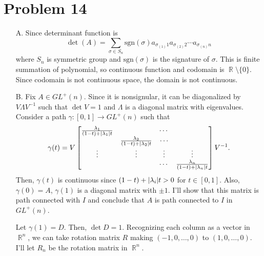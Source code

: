\documentclass{article}
\DeclareMathOperator{\rr}{\mathbb{R}}
\DeclarePairedDelimiter\abs{\lvert}{\rvert}%
\begin{document}
\section*{Problem 14}
\begin{enumerate}
\item[A.] Since determinant function is
\begin{equation*}
\det(A)=\sum\limits_{\sigma\in S_n} \text{sgn}(\sigma)a_{\sigma_(1)1}a_{\sigma_(2)2}\cdots a_{\sigma_(n)n}
\end{equation*}
where $S_n$ is symmetric group and $\text{sgn}(\sigma)$ is the signature of $\sigma$. This is finite summation of polynomial, so continuous function and codomain is $\rr\setminus\{0\}$. Since codomain is not continuous space, the domain is not continuous.
\item[B.] Fix $A\in GL^+(n)$. Since it is nonsignular, it can be diagonalized by $V\Lambda V^{-1}$ such that $\det{V}=1$ and $\Lambda$ is a diagonal matrix with eigenvalues. Consider a path $\gamma:[0,1]\rightarrow GL^+(n)$ such that
\begin{equation*}
\gamma(t)=
V\begin{bmatrix}
\frac{\lambda_1}{(1-t)+\abs{\lambda_1}t} & &  \cdots & \\

 & \frac{\lambda_2}{(1-t)+\abs{\lambda_2}t}& \cdots\\
\vdots& \vdots& \vdots & \vdots\\
& & \cdots & \frac{\lambda_n}{(1-t)+\abs{\lambda_n}t}
\end{bmatrix}V^{-1}.
\end{equation*}
Then, $\gamma(t)$ is continuous since $(1-t)+\abs{\lambda_i}t>0$ for $t\in [0,1]$. Also, $\gamma(0)=A$, $\gamma(1)$ is a diagonal matrix with $\pm 1$. I'll show that this matrix is path connected with $I$ and conclude that $A$ is path connected to $I$ in $GL^+(n)$.

Let $\gamma(1)=D$. Then, $\det{D}=1$. Recognizing each column as a vector in $\rr^n$, we can take rotation matrix $R$ making $(-1, 0, \ldots, 0)$ to $(1, 0, \ldots, 0)$.
\newline 
\newline
\newline
\newline
\newline
\newline
\newline
\newline
I'll let $R_n$ be the rotation matrix in $\rr^n$.


\end{enumerate}
\end{document}
